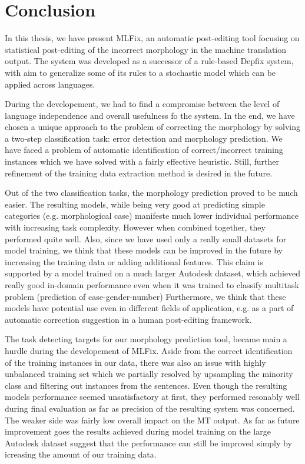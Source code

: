 \chapter{Conclusion}

In this thesis, we have present MLFix, an automatic post-editing tool focusing on statistical
post-editing of the incorrect morphology in the machine translation output. The system was
developed as a successor of a rule-based Depfix system, with aim to generalize some of its
rules to a stochastic model which can be applied across languages.

During the developement, we had to find a compromise between the level of language independence
and overall usefulness fo the system. In the end, we have chosen a unique approach to the problem of correcting
the morphology by solving a two-step classification task: error detection and morphology prediction.
We have faced a problem of automatic identification of correct/incorrect training instances
which we have solved with a fairly effective heuristic. Still, further refinement of the
training data extraction method is desired in the future.

Out of the two classification tasks, the morphology prediction proved to be much easier.
The resulting models, while being very good at predicting simple categories (e.g. morphological case)
manifeste much lower individual performance with increasing task complexity. However when
combined together, they performed quite well.
Also, since we have used only a really small datasets for model training, we think that these models
can be improved in the future by increasing the training data or adding additional features.
This claim is supported by a model trained on a much larger Autodesk dataset, which achieved really good
in-domain performance even when it was trained to classify multitask problem (prediction of case-gender-number)
Furthermore, we think that
these models have potential use even in different fields of application, e.g. as a part of automatic
correction suggestion in a human post-editing framework.

The task detecting targets for our morphology prediction tool, became main a hurdle
during the developement of MLFix. Aside from the correct identification of the training instances
in our data, there was also an issue with highly unbalanced training set which we partially resolved
by upsampling the minority class and filtering out instances from the  sentences.
Even though the resulting models performance seemed unsatisfactory at first, they performed resonably
well during final evaluation as far as precision of the resulting system was concerned. The weaker
side was fairly low overall impact on the MT output. As far as future improvement goes the results
achieved during model training on the large Autodesk dataset suggest that the performance can still be
improved simply by icreasing the amount of our training data.

